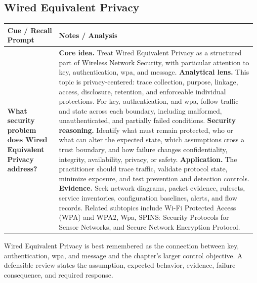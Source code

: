 \documentclass[11pt]{article}
\newcommand{\CornellHeader}{%
\rowcolor{Navy}\color{white}\bfseries Cue / Recall Prompt & \color{white}\bfseries Notes / Analysis\\\hline}
\newcommand{\CornellRow}[2]{%
\cellcolor{CueGray}\RaggedRight\textbf{#1} & \RaggedRight #2\\\hline}
\begin{document}
\subsection*{Wired Equivalent Privacy}
\begin{longtable}{>{\RaggedRight\arraybackslash}p{}|>{\RaggedRight\arraybackslash}p{}}
\CornellHeader
\CornellRow{What security problem does Wired Equivalent Privacy address?}{\textbf{Core idea.} Treat Wired Equivalent Privacy as a structured part of Wireless Network Security, with particular attention to key, authentication, wpa, and message. \textbf{Analytical lens.} This topic is privacy-centered: trace collection, purpose, linkage, access, disclosure, retention, and enforceable individual protections. For key, authentication, and wpa, follow traffic and state across each boundary, including malformed, unauthenticated, and partially failed conditions. \textbf{Security reasoning.} Identify what must remain protected, who or what can alter the expected state, which assumptions cross a trust boundary, and how failure changes confidentiality, integrity, availability, privacy, or safety. \textbf{Application.} The practitioner should trace traffic, validate protocol state, minimize exposure, and test prevention and detection controls. \textbf{Evidence.} Seek network diagrams, packet evidence, rulesets, service inventories, configuration baselines, alerts, and flow records. Related subtopics include Wi-Fi Protected Access (WPA) and WPA2, Wpa, SPINS: Security Protocols for Sensor Networks, and Secure Network Encryption Protocol.}
\end{longtable}
\begin{topicsummary}
Wired Equivalent Privacy is best remembered as the connection between key, authentication, wpa, and message and the chapter's larger control objective. A defensible review states the assumption, expected behavior, evidence, failure consequence, and required response.
\end{topicsummary}
\end{document}
